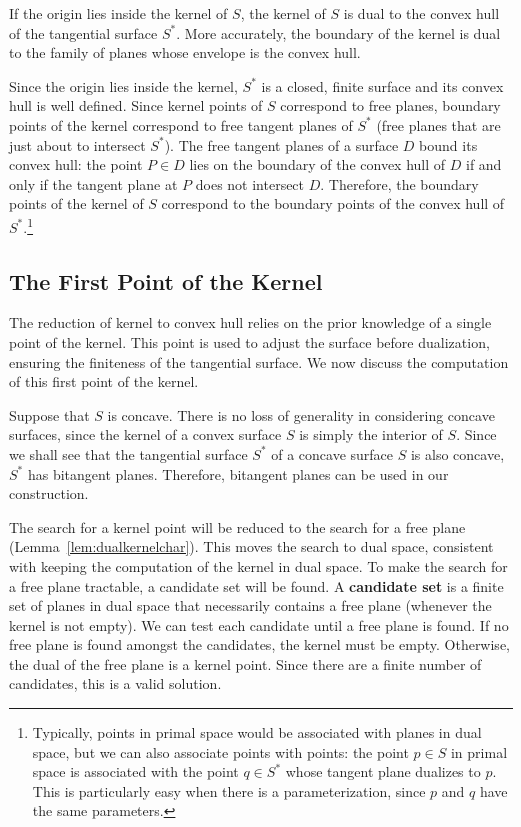 \documentclass{acmsiggraph}
\begin{document}
\begin{theorem}
\label{thm:kernelhull}
If the origin lies inside the kernel of $S$,
the kernel of $S$ is dual to the convex hull of the tangential surface $S^*$.
More accurately, the boundary of the kernel is dual to the family of planes whose
envelope is the convex hull.
\end{theorem}
\prf
Since the origin lies inside the kernel, $S^*$ is a closed, finite surface
and its convex hull is well defined.
Since kernel points of $S$ correspond to free planes,
boundary points of the kernel correspond to free tangent planes of $S^*$
(free planes that are just about to intersect $S^*$).
The free tangent planes of a surface $D$ bound its convex hull: the point $P \in D$ lies
on the boundary of the convex hull of $D$ if and only if the tangent plane at $P$ 
does not intersect $D$.
Therefore, the boundary points of the kernel of $S$ correspond to the boundary points
of the convex hull of $S^*$.\footnote{Typically, points in primal space would be associated with planes in dual space,
	but we can also associate points with points:
	the point $p \in S$ in primal space is associated
	with the point $q \in S^*$ whose tangent plane dualizes to $p$.
	This is particularly easy when there is a parameterization, since $p$ and $q$ 
	have the same parameters.}
\QED


\subsection{The First Point of the Kernel}
\label{sec:firstpt}

The reduction of kernel to convex hull relies on the prior knowledge
of a single point of the kernel.
This point is used to adjust the surface before dualization, ensuring
the finiteness of the tangential surface.
We now discuss the computation of this first point of the kernel.

Suppose that $S$ is concave.
There is no loss of generality in considering concave surfaces,
since the kernel of a convex surface $S$ is simply the interior of $S$.
Since we shall see that the tangential surface $S^*$ of
a concave surface $S$ is also concave, $S^*$ has bitangent planes.
Therefore, bitangent planes can be used in our construction. %

The search for a kernel point will be reduced to the search for a free plane
(Lemma~\ref{lem:dualkernelchar}).
This moves the search to dual space, consistent with keeping the computation
of the kernel in dual space.
To make the search for a free plane tractable, a candidate set will be found.
A {\bf candidate set} is a finite set of planes in dual space
that necessarily contains a free plane (whenever the kernel is not empty).
We can test each candidate until a free plane is found.
If no free plane is found amongst the candidates,
the kernel must be empty.
Otherwise, the dual of the free plane is a kernel point.
Since there are a finite number of candidates, this is a valid solution.
\end{document}
